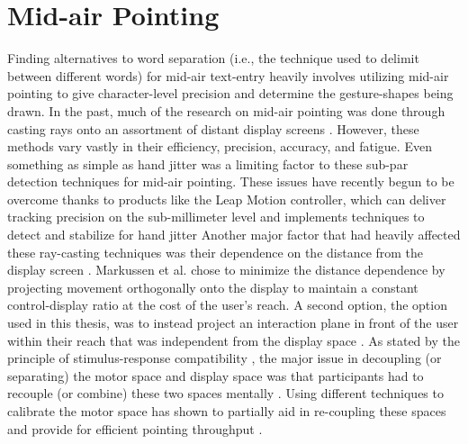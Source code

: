 \section{Mid-air Pointing} \label{mid_air_pointing}
Finding alternatives to word separation (i.e., the technique used to delimit between different words) for mid-air text-entry heavily involves utilizing mid-air pointing to give character-level precision and determine the gesture-shapes being drawn. In the past, much of the research on mid-air pointing was done through casting rays onto an assortment of distant display screens \cite{ref_large_display_pointing,ref_air_pointing,ref_ray_pointing_large_displays,ref_shadow_reaching,ref_freehand_pointing_large_displays,ref_large_screen_pointing_gestures}. However, these methods vary vastly in their efficiency, precision, accuracy, and fatigue. Even something as simple as hand jitter was a limiting factor to these sub-par detection techniques for mid-air pointing. These issues have recently begun to be overcome thanks to products like the Leap Motion controller, which can deliver tracking precision on the sub-millimeter level and implements techniques to detect and stabilize for hand jitter \cite{ref_leap_device_evaluation_1,ref_leap_device_evaluation_2} Another major factor that had heavily affected these ray-casting techniques was their dependence on the distance from the display screen \cite{ref_mid_air_text_large_displays}. Markussen et al. \citeyear{ref_selection_based_mid_air} chose to minimize the distance dependence by projecting movement orthogonally onto the display to maintain a constant control-display ratio at the cost of the user's reach. A second option, the option used in this thesis, was to instead project an interaction plane in front of the user within their reach that was independent from the display space \cite{ref_alvin_thesis,ref_darren_thesis,ref_leap_pointing_device}. As stated by the principle of stimulus-response compatibility \cite{ref_stimulus_response_compatibility}, the major issue in decoupling (or separating) the motor space and display space was that participants had to recouple (or combine) these two spaces mentally \cite{ref_vulture}. Using different techniques to calibrate the motor space has shown to partially aid in re-coupling these spaces and provide for efficient pointing throughput \cite{ref_alvin_thesis,ref_darren_thesis}.

